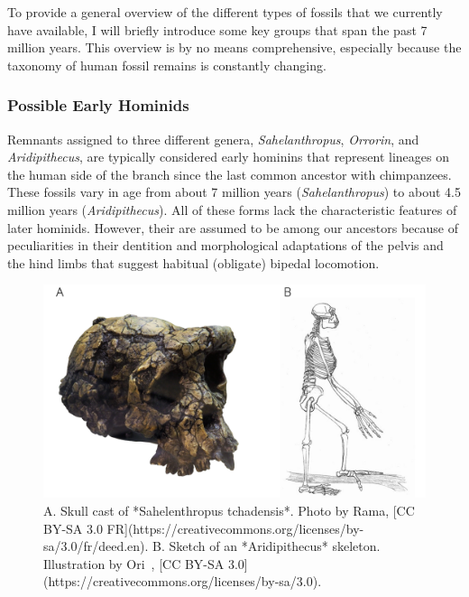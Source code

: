 \documentclass[
]{book}
\begin{document}
To provide a general overview of the different types of fossils that we currently have available, I will briefly introduce some key groups that span the past 7 million years. This overview is by no means comprehensive, especially because the taxonomy of human fossil remains is constantly changing.

\hypertarget{possible-early-hominids}{%
\subsubsection*{Possible Early Hominids}\label{possible-early-hominids}}

Remnants assigned to three different genera, \emph{Sahelanthropus}, \emph{Orrorin}, and \emph{Aridipithecus}, are typically considered early hominins that represent lineages on the human side of the branch since the last common ancestor with chimpanzees. These fossils vary in age from about 7 million years (\emph{Sahelanthropus}) to about 4.5 million years (\emph{Aridipithecus}). All of these forms lack the characteristic features of later hominids. However, their are assumed to be among our ancestors because of peculiarities in their dentition and morphological adaptations of the pelvis and the hind limbs that suggest habitual (obligate) bipedal locomotion.

\begin{figure}
\includegraphics[width=1\linewidth]{images/earlyhominins} \caption{A. Skull cast of *Sahelenthropus tchadensis*. Photo by Rama, [CC BY-SA 3.0 FR](https://creativecommons.org/licenses/by-sa/3.0/fr/deed.en). B. Sketch of an *Aridipithecus* skeleton. Illustration by Ori~, [CC BY-SA 3.0](https://creativecommons.org/licenses/by-sa/3.0).}\label{fig:earlyhom}
\end{figure}
\end{document}
